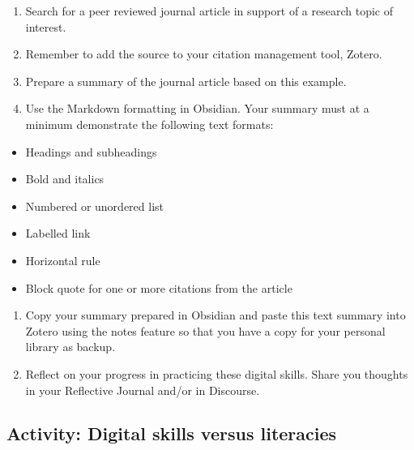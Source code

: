 \documentclass[
]{book}
\providecommand{\tightlist}{%
  \setlength{\itemsep}{0pt}\setlength{\parskip}{0pt}}
\theoremstyle{definition}
\theoremstyle{definition}
\theoremstyle{definition}
\theoremstyle{definition}
\theoremstyle{remark}
\begin{document}
\begin{reflect}
\begin{enumerate}
\def\labelenumi{\arabic{enumi}.}
\tightlist
\item
  Search for a peer reviewed journal article in support of a research topic of interest.
\item
  Remember to add the source to your citation management tool, Zotero.
\item
  Prepare a summary of the journal article based on this example.
\item
  Use the Markdown formatting in Obsidian. Your summary must at a minimum demonstrate the following text formats:
\end{enumerate}

\begin{itemize}
\tightlist
\item
  Headings and subheadings
\item
  Bold and italics
\item
  Numbered or unordered list
\item
  Labelled link
\item
  Horizontal rule
\item
  Block quote for one or more citations from the article
\end{itemize}

\begin{enumerate}
\def\labelenumi{\arabic{enumi}.}
\item
  Copy your summary prepared in Obsidian and paste this text summary into Zotero using the notes feature so that you have a copy for your personal library as backup.
\item
  Reflect on your progress in practicing these digital skills. Share you thoughts in your Reflective Journal and/or in Discourse.
\end{enumerate}
\end{reflect}

\hypertarget{activity-digital-skills-versus-literacies}{%
\subsection*{Activity: Digital skills versus literacies}\label{activity-digital-skills-versus-literacies}}
\end{document}
